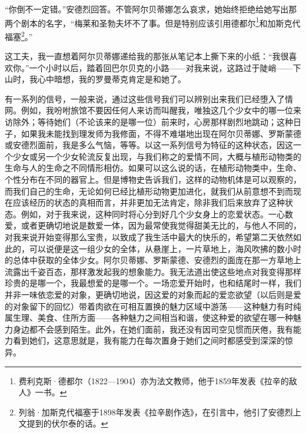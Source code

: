 \par “你倒不一定错。”安德烈回答。不管阿尔贝蒂娜怎么哀求，她始终拒绝给她写出那两个剧本的名字，“梅莱和圣勃夫坏不了事。但是特别应该引用德都尔\footnote{费利克斯·德都尔（1822—1904）亦为法文教师，他于1859年发表《拉辛的敌人》一书。}和加斯克代福塞\footnote{列翁·加斯克代福塞于1898年发表《拉辛剧作选》，在引言中，他引了安德烈上文提到的伏尔泰的话。}。”
\par 这工夫，我一直想着阿尔贝蒂娜递给我的那张从笔记本上撕下来的小纸：“我很喜欢你。”一个小时以后，踏着回巴尔贝克的小路——对我来说，这路过于陡峭——下山时，我心中暗想，我的罗曼蒂克肯定是和她了。
\par 有一系列的信号，一般来说，通过这些信号我们可以辨别出来我们已经堕入了情网。例如，我吩咐旅馆不要因任何人来访而叫醒我，唯独这几个少女中的哪一位来访除外；等待她们（不论该来的是哪一位）前来时，心房那样剧烈地跳动；这种日子，如果我未能找到理发师为我修面，不得不难堪地出现在阿尔贝蒂娜、罗斯蒙德或安德烈面前，我是多么气恼，等等。以这一系列信号为特征的这种状态，因这一个少女或另一个少女轮流反复出现，与我们称之的爱情不同，大概与植形动物类的生命与人的生命之不同情形相仿。如果可以这么说的话，在植形动物类中，生命、个性分布在不同的器官上。但是博物史告诉我们，这样的动物机体是可以观察的，而我们自己的生命，无论如何已经比植形动物更加进化，就我们从前意想不到而现在应该经历的状态的真相而言，并非更加无法肯定，除非我们后来放弃了这种状态。例如，对于我来说，这种同时将心分到好几个少女身上的恋爱状态。一心数爱，或者更确切地说是数爱一体，因为最常使我觉得甜美无比的，与他人不同的，对我来说开始变得那么宝贵，以致成了我生活中最大的快乐的，希望第二天依然如此的，可以说便是这一组少女的全体，从悬崖上，一片草地上，海风吹拂的数小时的总体中获取的全体少女。阿尔贝蒂娜、罗斯蒙德、安德烈的面庞在那一方草地上流露出千姿百态，那样激发起我的想象能力。我无法道出使这些地点对我变得那样珍贵的是哪一个，我最想爱的是哪一个。一场恋爱开始时，也和结尾时一样，我们并非一味依恋爱的对象，更确切地说，因这爱的对象而起的爱恋欲望（以后则是爱的对象留下的回忆）带着肉欲在可相互置换的魅力区域中游荡——这种魅力有时纯属生理、美食、住所方面——各种魅力之间相当和谐，使这种爱的欲望在哪一种魅力身边都不会感到陌生。此外，在她们面前，我还没有因司空见惯而厌倦，我有能力看到她们，这意思就是，我有能力在每次置身于她们之间时都感受到深深的惊异。
